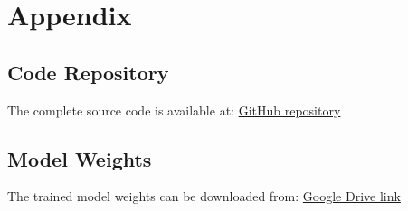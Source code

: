 \documentclass[11pt]{article}
\begin{document}
\section*{Appendix}

\subsection*{Code Repository}
The complete source code is available at:
\href{https://github.com/Kevin-LD/fashion_mnist_mlp}{GitHub repository}

\subsection*{Model Weights}
The trained model weights can be downloaded from:
\href{https://drive.google.com/file/d/1oR0kwrEkUiJceKnIKqiBwuYCAAms9fPR/view?usp=sharing}{Google Drive link}
\end{document}
